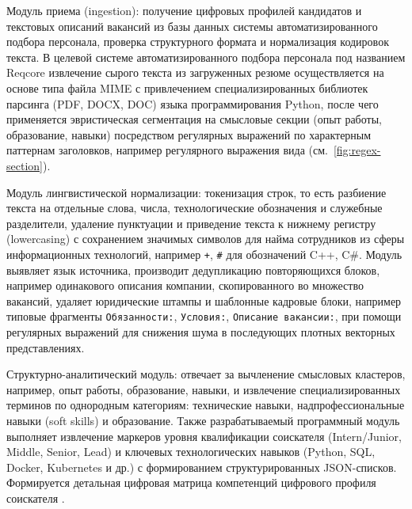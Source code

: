 \begin{compactenum}

  \item Модуль приема (ingestion): получение цифровых профилей кандидатов и текстовых описаний вакансий из базы данных системы автоматизированного подбора персонала, проверка структурного формата и нормализация кодировок текста. В целевой системе автоматизированного подбора персонала под названием Reqcore извлечение сырого текста из загруженных резюме осуществляется на основе типа файла MIME с привлечением специализированных библиотек парсинга (PDF, DOCX, DOC) языка программирования Python, после чего применяется эвристическая сегментация на смысловые секции (опыт работы, образование, навыки) посредством регулярных выражений по характерным паттернам заголовков, например регулярного выражения вида (см.~\ref{fig:regex-section}).

  \item Модуль лингвистической нормализации: токенизация строк, то есть разбиение текста на отдельные слова, числа, технологические обозначения и служебные разделители, удаление пунктуации и приведение текста к нижнему регистру (lowercasing) с сохранением значимых символов для найма сотрудников из сферы информационных технологий, например \texttt{+}, \texttt{\#} для обозначений C++, C\#. Модуль выявляет язык источника, производит дедупликацию повторяющихся блоков, например одинакового описания компании, скопированного во множество вакансий, удаляет юридические штампы и шаблонные кадровые блоки, например типовые фрагменты \texttt{Обязанности:}, \texttt{Условия:}, \texttt{Описание вакансии:}, при помощи регулярных выражений для снижения шума в последующих плотных векторных представлениях.

  \item Структурно-аналитический модуль: отвечает за вычленение смысловых кластеров, например, опыт работы, образование, навыки, и извлечение специализированных терминов по однородным категориям: технические навыки, надпрофессиональные навыки (soft skills) и образование. Также разрабатываемый программный модуль выполняет извлечение маркеров уровня квалификации соискателя (Intern/Junior, Middle, Senior, Lead) и ключевых технологических навыков (Python, SQL, Docker, Kubernetes и др.) с формированием структурированных JSON-списков. Формируется детальная цифровая матрица компетенций цифрового профиля соискателя \cite{src24}.


\end{compactenum}

